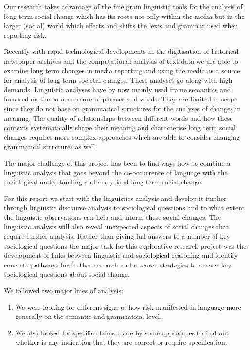 Our research takes advantage of the fine grain linguistic tools for the analysis of long term social change which has its roots not only within the media but in the larger (social) world which effects and shifts the lexis and grammar used when reporting risk.

Recently with rapid technological developments in the digitisation of historical newspaper archives and the computational analysis of text data we are able to examine long term changes in media reporting and using the media as a source for analysis of long term societal changes.
These analyses go along with high demands. Linguistic analyses have by now mainly used frame semantics and focussed on the co-occurrence of phrases and words. They are limited in scope since they do not base on grammatical structures for the analyses of changes in meaning. The quality of relationships between different words and how these contexts systematically shape their meaning and characterise long term social changes requires more complex approaches which are able to consider changing grammatical structures as well.

The major challenge of this project has been to find ways how to combine a linguistic analysis that goes beyond the co-occurrence of language with the sociological understanding and analysis of long term social change. 

For this report we start with the linguistics analysis and develop it further through linguistic discourse analysis to sociological questions and to what extent the linguistic observations can help and inform these social changes. The linguistic analysis will also reveal unexpected aspects of social changes that require further analysis. Rather than giving full answers to a number of key sociological questions the major task for this explorative research project was the development of links between linguistic and sociological reasoning and identify concrete pathways for further research and research strategies to answer key sociological questions about social change.

We followed two major lines of analysis:

\begin{enumerate}
\item We were looking for different signs of how risk manifested in language more generally on the semantic and grammatical level. 
\item We also looked for specific claims made by some approaches to find out whether is any indication that they are correct or require specification. 
\end{enumerate}

